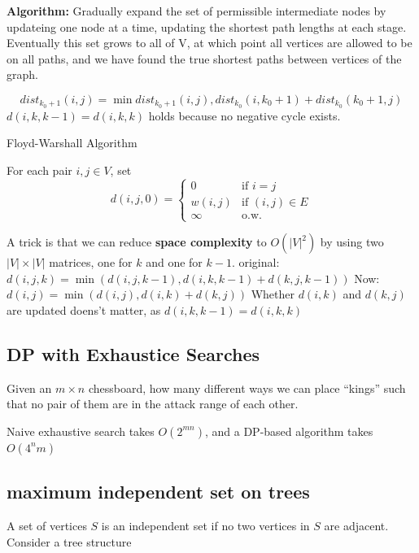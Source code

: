 \textbf{Algorithm:} Gradually expand the set of permissible intermediate nodes by updateing one node at a time, updating the shortest path lengths at each stage. Eventually this set grows to all of V, at which point all vertices are allowed to be on all paths, and we have found the true shortest paths between vertices of the graph.

\[
    dist_{k_0+1}(i,j)=\min{dist_{k_0+1}(i,j),dist_{k_0}(i,k_0+1)+dist_{k_0}(k_0+1,j)}\]
$d(i,k,k-1)=d(i,k,k)$ holds because no negative cycle exists. 

\begin{algorithm}
    \caption{Floyd-Warshall Algorithm}
    For each pair $i,j \in V$, set 
    \begin{equation}
        d(i,j,0)=
        \begin{cases}
            0 & \text{if } i=j\\
            w(i,j) & \text{if } (i,j)\in E\\
            \infty & \text{o.w.}
        \end{cases}
    \end{equation}
\end{algorithm}
A trick is that we can reduce \textbf{space complexity} to $O(|V|^2)$ by using two $|V|\times |V|$ matrices, one for $k$ and one for $k-1$.
original: $d(i,j,k)=\min(d(i,j,k-1),d(i,k,k-1)+d(k,j,k-1))$
Now: $d(i,j)=\min(d(i,j),d(i,k)+d(k,j))$
Whether $d(i,k)$ and $d(k,j)$ are updated doens't matter, as $d(i,k,k-1)=d(i,k,k)$

\subsection{DP with Exhaustice Searches}
Given an $m\times n$ chessboard, how many different
ways we can place “kings” such that no pair of them are in
the attack range of each other.

Naive exhaustive search takes $O(2^{mn})$, and a DP-based algorithm takes $O(4^nm)$



\subsection{maximum independent set on trees}
A set of vertices $S$ is an independent set if no two vertices in $S$ are adjacent.
Consider a tree structure

